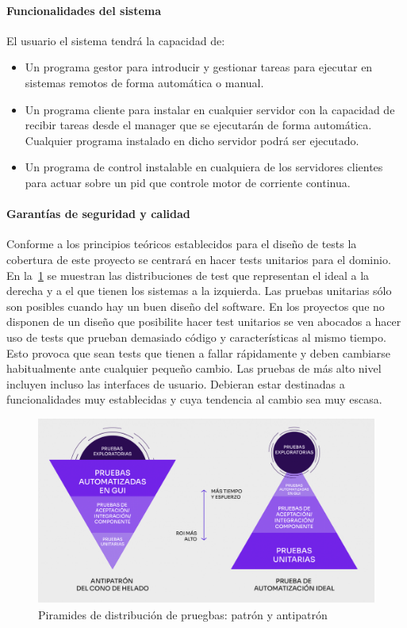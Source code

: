 \paragraph{Funcionalidades del sistema}

El usuario el sistema tendrá la capacidad de:

\begin{itemize}
    \item Un programa gestor para introducir y gestionar tareas para ejecutar en sistemas remotos de forma automática o manual.
    \item Un programa cliente para instalar en cualquier servidor con la capacidad de recibir tareas desde el manager que se ejecutarán de forma automática.
    Cualquier programa instalado en dicho servidor podrá ser ejecutado.
    \item Un programa de control instalable en cualquiera de los servidores clientes para actuar sobre un pid que controle motor de corriente continua.
\end{itemize}

\paragraph{Garantías de seguridad y calidad}\label{par:testing}
    Conforme a los principios teóricos establecidos para el diseño de tests la cobertura de este proyecto se centrará en hacer tests unitarios para el dominio.
    En la~\cref{fig:piramidTest} se muestran las distribuciones de test que representan el ideal a la derecha y a el que tienen los sistemas a la izquierda.
    Las pruebas unitarias sólo son posibles cuando hay un buen diseño del software.
    En los proyectos que no disponen de un diseño que posibilite hacer test unitarios se ven abocados a hacer uso de tests que prueban demasiado código y características al mismo tiempo.
    Esto provoca que sean tests que tienen a fallar rápidamente y deben cambiarse habitualmente ante cualquier pequeño cambio.
    Las pruebas de más alto nivel incluyen incluso las interfaces de usuario.
    Debieran estar destinadas a funcionalidades muy establecidas y cuya tendencia al cambio sea muy escasa.

    \begin{figure}[H]
        \centering
        \includegraphics[height=0.35\textheight]{./part/Proyecto_ejecutivo/memoria_descriptiva/prestaciones/TestPiramid}
        \caption{Piramides de distribución de pruegbas: patrón y antipatrón}\label{fig:piramidTest}
    \end{figure}

